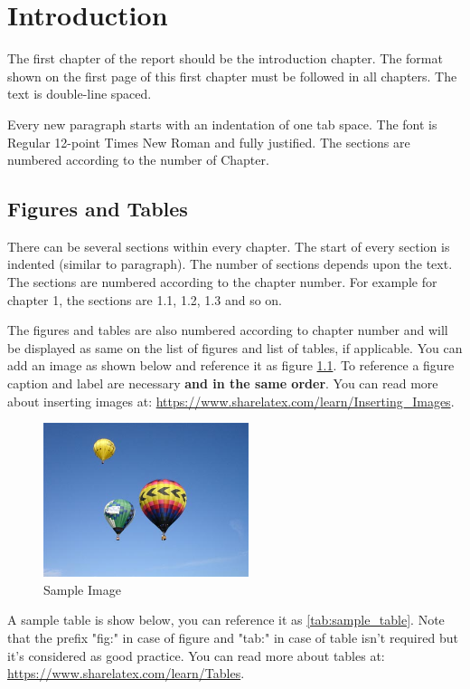 \chapter{Introduction}\label{ch:introduction}
The first chapter of the report should be the introduction chapter. The format shown on the first page of this first chapter must be followed in all chapters. The text is double-line spaced. 

Every new paragraph starts with an indentation of one tab space. The font is Regular 12-point Times New Roman and fully justified. The sections are numbered according to the number of Chapter.

\section{Figures and Tables}
There can be several sections within every chapter. The start of every section is indented (similar to paragraph). The number of sections depends upon the text. The sections are numbered according to the chapter number. For example for chapter 1, the sections are 1.1, 1.2, 1.3 and so on. 

The figures and tables are also numbered according to chapter number and will be displayed as same on the list of figures and list of tables, if applicable. You can add an image as shown below and reference it as figure \ref{fig:sample_image}. To reference a figure caption and label are necessary \textbf{and in the same order}. You can read more about inserting images at: \url{https://www.sharelatex.com/learn/Inserting_Images}.

\begin{figure}[ht]
  \centering
  \includegraphics[width=6cm]{images/sample_image.jpeg}
  \caption{Sample Image}
  \label{fig:sample_image}
\end{figure}

A sample table is show below, you can reference it as \ref{tab:sample_table}. Note that the prefix "fig:" in case of figure and "tab:" in case of table isn't required but it's considered as good practice. You can read more about tables at: \url{https://www.sharelatex.com/learn/Tables}.

